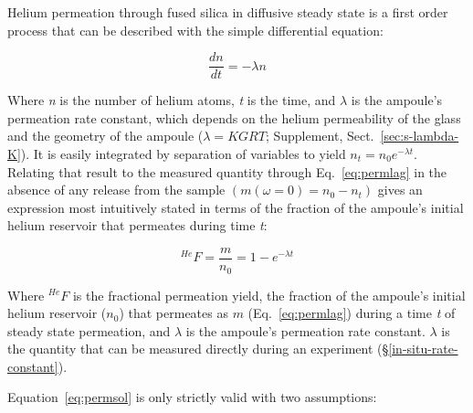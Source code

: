 Helium permeation through fused silica in diffusive steady state is a first order process that can be described with the simple differential equation:

\begin{equation}
\label{eq:permode}
\frac{dn}{dt} = - \lambda n
\end{equation}

Where \emph{n} is the number of helium atoms, \emph{t} is the time, and \(\lambda\) is the ampoule's permeation rate constant, which depends on the helium permeability of the glass and the geometry of the ampoule (\(\lambda = KGRT\); Supplement, Sect.~\ref{sec:s-lambda-K}). It is easily integrated by separation of variables to yield \(n_{t} = n_{0}e^{- \lambda t}\). Relating that result to the measured quantity through Eq.~\eqref{eq:permlag} in the absence of any release from the sample \(\left( m(\omega = 0) = n_{0} - n_{t} \right)\) gives an expression most intuitively stated in terms of the fraction of the ampoule's initial helium reservoir that permeates during time \emph{t}:

\begin{equation}
\label{eq:permsol}
^{He}F = \frac{m}{n_{0}} = 1 - e^{- \lambda t}
\end{equation}

Where \(^{He}F\) is the fractional permeation yield, the fraction of the ampoule's initial helium reservoir (\(n_{0}\)) that permeates as \(m\) (Eq.~\eqref{eq:permlag}) during a time \emph{t} of steady state permeation, and \(\lambda\) is the ampoule's permeation rate constant. \(\lambda\) is the quantity that can be measured directly during an experiment (\S\ref{in-situ-rate-constant}).

Equation~\eqref{eq:permsol} is only strictly valid with two assumptions:

